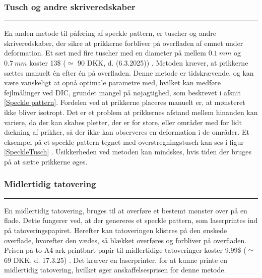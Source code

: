 \subsubsection{Tusch og andre skriveredskaber}  \plainbreak{-0.4}
En anden metode til påføring af speckle pattern, er tuscher og andre skriveredskaber, der sikre at prikkerne forbliver på overfladen af emnet under deformation. Et sæt med fire tuscher med en diameter på mellem \(\SI{0,1}{mm}\) og \(\SI{0,7}{mm}\) koster 13\$ ($\simeq$ 90 DKK, d. (6.3.2025)) \parencite{STAEDTLER2025Amazon.comTousch}. Metoden kræver, at prikkerne sættes manuelt én efter én på overfladen. Denne metode er tidskrævende, og kan være vanskeligt at opnå optimale parametre med, hvilket kan medføre fejlmålinger ved DIC, grundet mangel på nøjagtighed, som beskrevet i afsnit \ref{Speckle pattern}. Fordelen ved at prikkerne placeres manuelt er, at mønsteret ikke bliver isotropt. 
Det er et problem at prikkernes afstand mellem hinanden kan variere, da der kan skabes pletter, der er for store, eller områder med for lidt dækning af prikker, så der ikke kan observeres en deformation i de områder. Et eksempel på et speckle pattern tegnet med overstregningstusch kan ses i figur \ref{SpeckleTusch} \parencite{HoseinSalmanpour2013PDFWalls}. Usikkerheden ved metoden kan mindskes, hvis tiden der bruges på at sætte prikkerne øges. 







\subsubsection{Midlertidig tatovering}  \plainbreak{-0.4}
En midlertidig tatovering, bruges til at overføre et bestemt mønster over på en flade. Dette fungerer ved, at der genereres et speckle pattern, som laserprintes ind på tatoveringspapiret. Herefter kan tatoveringen klistres på den ønskede overflade, hvorefter den vædes, så blækket overføres og forbliver på overfladen. Prisen på to A4 ark printbart papir til midlertidige tatoveringer koster 9.99\$ ($\simeq$ 69 DKK, d. 17.3.25) \parencite{SilhouetteAmerica2025TemporaryClearMEDIA-TATTOO-3T}. Det kræver en laserprinter, for at kunne printe en midlertidig tatovering, hvilket øger anskaffelsesprisen for denne metode.\parencite{Quino2021SpeckleEndurance}

